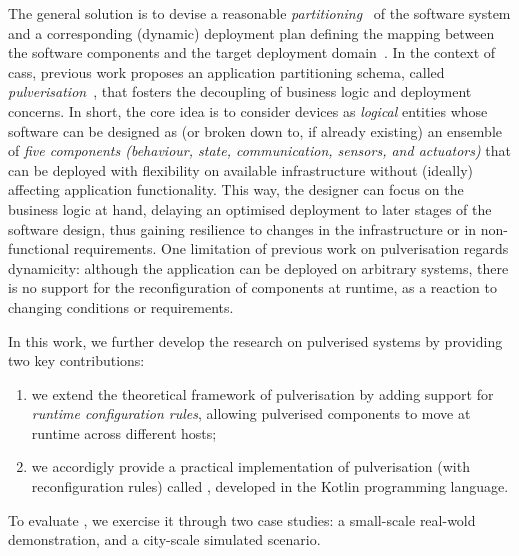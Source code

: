 \documentclass[conference]{IEEEtran}
\newcommand{\meta}[1]{{\color{blue}#1}}
\begin{document}
The general solution is to devise 
 a reasonable \emph{partitioning}~\cite{DBLP:journals/jnca/LiuASGBQ15} of the software system
 and a corresponding (dynamic) deployment plan 
 defining the mapping between the software components and the target deployment domain~\cite{DBLP:journals/jss/ArcangeliBL15}.
%
In the context of \acp{cas},
 previous work proposes an application partitioning schema,
 called \emph{pulverisation}~\cite{FI2020-pulverization},
 that fosters the decoupling of business logic and deployment concerns.
%
In short, the core idea is to consider devices as \emph{logical} entities
whose software can be designed as (or broken down to, if already existing) an ensemble of \emph{five components
(behaviour, state, communication, sensors, and actuators)}
 that can be deployed with flexibility on available infrastructure without (ideally) affecting application functionality. %
%
This way, the designer can focus on the business logic at hand,
delaying an optimised deployment to later stages of the software design,
thus gaining resilience to changes in the infrastructure or in non-functional requirements.
%
One limitation of previous work on pulverisation regards dynamicity:
although the application can be deployed on arbitrary systems,
there is no support for the reconfiguration of components at runtime, as a reaction to changing conditions or requirements.

In this work,
we further develop the research on pulverised systems by providing two key contributions:
%
\begin{enumerate}
 \item we extend the theoretical framework of pulverisation by adding support for
\emph{runtime configuration rules}, allowing pulverised components to move at runtime across different hosts;
 \item we accordigly provide a practical implementation of pulverisation (with reconfiguration rules) called \emph{\ourframework{}}, developed in the Kotlin programming language.
\end{enumerate}
%
To evaluate \ourframework{}, we exercise it through two case studies:
a small-scale real-wold demonstration, and a city-scale simulated scenario.

\end{document}
